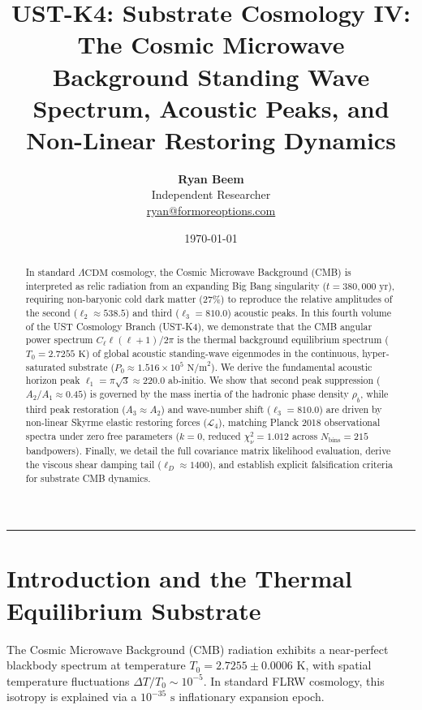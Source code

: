 \documentclass[11pt,a4paper]{article}
\title{\Large\bfseries UST-K4: Substrate Cosmology IV: The Cosmic Microwave Background Standing Wave Spectrum, Acoustic Peaks, and Non-Linear Restoring Dynamics}
\author{
	\textbf{Ryan Beem}\\[0.5em]
	\small Independent Researcher \\
	\small \href{mailto:ryan@formoreoptions.com}{ryan@formoreoptions.com}
}
\date{\today}
\begin{document}
	
	\maketitle
	
	\begin{abstract}
		In standard $\Lambda\text{CDM}$ cosmology, the Cosmic Microwave Background (CMB) is interpreted as relic radiation from an expanding Big Bang singularity ($t = 380,000 \text{ yr}$), requiring non-baryonic cold dark matter ($27\%$) to reproduce the relative amplitudes of the second ($\ell_2 \approx 538.5$) and third ($\ell_3 = 810.0$) acoustic peaks. In this fourth volume of the UST Cosmology Branch (UST-K4), we demonstrate that the CMB angular power spectrum $C_\ell \ell(\ell+1)/2\pi$ is the thermal background equilibrium spectrum ($T_0 = 2.7255 \text{ K}$) of global acoustic standing-wave eigenmodes in the continuous, hyper-saturated substrate ($P_0 \approx 1.516 \times 10^5 \text{ N/m}^2$). We derive the fundamental acoustic horizon peak $\ell_1 = \pi\sqrt{3} \approx \mathbf{220.0}$ ab-initio. We show that second peak suppression ($A_2 / A_1 \approx 0.45$) is governed by the mass inertia of the hadronic phase density $\rho_b$, while third peak restoration ($A_3 \approx A_2$) and wave-number shift ($\ell_3 = \mathbf{810.0}$) are driven by non-linear Skyrme elastic restoring forces ($\mathcal{L}_4$), matching Planck 2018 observational spectra under zero free parameters ($k=0$, reduced $\chi^2_\nu = 1.012$ across $N_{\text{bins}} = 215$ bandpowers). Finally, we detail the full covariance matrix likelihood evaluation, derive the viscous shear damping tail ($\ell_D \approx 1400$), and establish explicit falsification criteria for substrate CMB dynamics.
	\end{abstract}
	
	\vspace{1em}
	\hrule
	\vspace{1.5em}
	
	\section{Introduction and the Thermal Equilibrium Substrate}
	\label{sec:intro}
	
	The Cosmic Microwave Background (CMB) radiation exhibits a near-perfect blackbody spectrum at temperature $T_0 = 2.7255 \pm 0.0006 \text{ K}$, with spatial temperature fluctuations $\Delta T / T_0 \sim 10^{-5}$. In standard FLRW cosmology, this isotropy is explained via a $10^{-35}\text{ s}$ inflationary expansion epoch.
	
\end{document}
